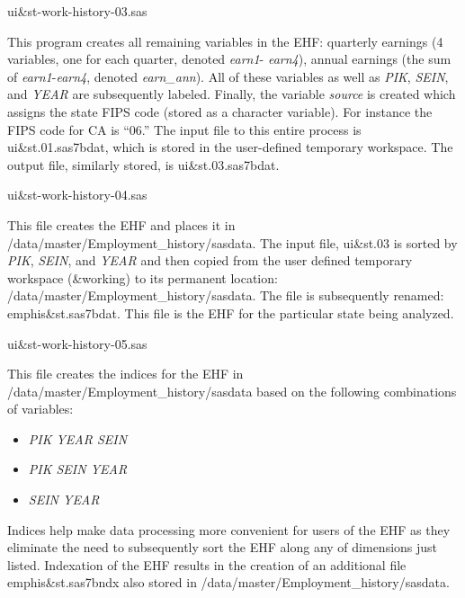 \begin{description}
\begin{steps}
\item ui{\&}st-work-history-03.sas
  
  This program creates all remaining variables in the EHF:
  quarterly earnings (4 variables, one for each quarter, denoted
  \textit{earn1}- \textit{earn4}), annual earnings (the sum of
  \textit{earn1}-\textit{earn4}, denoted \textit{earn{\_}ann}). All of
  these variables as well as \textit{PIK},
  \textit{SEIN}, and \textit{YEAR} are subsequently
  labeled. Finally, the variable \textit{source} is created which assigns
  the state FIPS code (stored as a character variable). For
  instance the FIPS code for CA is ``06.''  The input file to this entire
  process is ui{\&}st.01.sas7bdat, which is stored in the user-defined
  temporary workspace. The output file, similarly stored, is
  ui{\&}st.03.sas7bdat.

\item ui{\&}st-work-history-04.sas
  
  This file creates the EHF and places it in
  /data/master/Employment{\_}history/sasdata. The input file, ui{\&}st.03
  is sorted by \textit{PIK}, \textit{SEIN}, and
  \textit{YEAR} and then copied from the user defined temporary
  workspace ({\&}working) to its permanent location:
  /data/master/Employment{\_}history/sasdata. The file is subsequently
  renamed: emphis{\&}st.sas7bdat. This file is the EHF for the particular
  state being analyzed.


\item  ui{\&}st-work-history-05.sas

This file creates the indices for the EHF in 
/data/master/Employment{\_}history/sasdata based on the following 
combinations of variables: 

\begin{itemize}
\item \textit{PIK YEAR SEIN}
\item \textit{PIK SEIN YEAR}
\item \textit{SEIN YEAR}
\end{itemize}
Indices help make data processing more convenient for users of the EHF 
as they eliminate the need to subsequently sort the EHF along any of 
dimensions just listed. Indexation of the EHF results in the creation of an 
additional file emphis{\&}st.sas7bndx also stored in 
/data/master/Employment{\_}history/sasdata. 





\end{steps}
\end{description}
